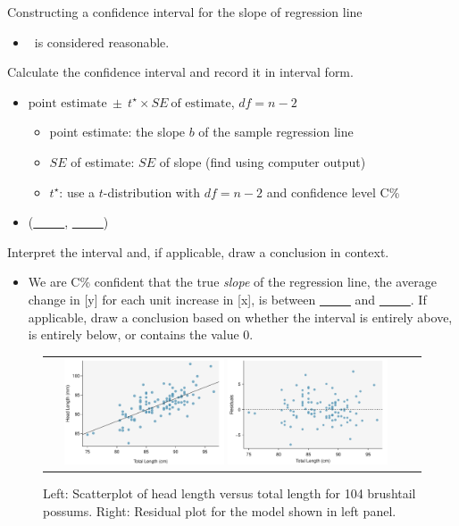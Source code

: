 \begin{onebox}{Constructing a confidence interval for the slope of regression line}
\begin{itemize}
\item[] \ \quad is considered reasonable.  
\end{itemize}
 Calculate the confidence interval and record it in interval form.
\begin{itemize}
\item[] $\text{point estimate}\ \pm\ t^{\star} \times SE\ \text{of estimate}$, \quad $df = n - 2$
\begin{itemize}											
\item[] point estimate: the slope $b$ of the sample regression line
\item[] $SE$ of estimate: $SE$ of slope (find using computer output)
\item[] $t^{\star}$: use a $t$-distribution with $df = n-2$ and confidence level C\%
\end{itemize}
\item[] (\underline{\ \ \ \ \ }, \underline{\ \ \ \ \ })
\end{itemize}
  Interpret the interval and, if applicable, draw a conclusion in context.\vspace{-1mm}
\begin{itemize}
\item[] We are C\%  confident that the true \emph{slope} of the regression line, the average change in [y] for each unit increase in [x], is between \underline{\ \ \ \ \ } and \underline{\ \ \ \ \ }. If applicable, draw a conclusion based on whether the interval is entirely above, is entirely below, or contains the value 0. 
\end{itemize}
\end{onebox}

\begin{figure}%
   \centering
  \begin{tabular}{cc}
   \includegraphics[width=0.45\textwidth]{ch_regr_simple_linear/figures/possumInference/possumScatter}
   \includegraphics[width=0.45\textwidth]{ch_regr_simple_linear/figures/possumInference/possumResidual}
\end{tabular}
   \caption{Left: Scatterplot of head length versus total length for 104 brushtail possums.   Right: Residual plot for the model shown in left panel.  }
\label{possumInferencePlots}
\end{figure}

